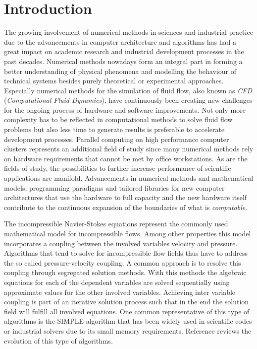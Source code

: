 \section{Introduction}

The growing involvement of numerical methods in sciences and industrial practice due to the advancements in computer architecture and algorithms has had a great impact on academic research and industrial development processes in the past decades. Numerical methods nowadays form an integral part in forming a better understanding of physical phenomena and modelling the behaviour of technical systems besides purely theoretical or experimental approaches. Especially numerical methods for the simulation of fluid flow, also known as \emph{CFD} (\emph{Computational Fluid Dynamics}), have continuously been creating new challenges for the ongoing process of hardware and software improvements. Not only more complexity has to be reflected in computational methods to solve fluid flow problems but also less time to generate results is preferable to accelerate development processes. Parallel computing on high performance computer clusters represents an additional field of study since many numerical methods rely on hardware requirements that cannot be met by office workstations. As are the fields of study, the possibilities to further increase performance of scientific applications are manifold. Advancements in numerical methods and mathematical models, programming paradigms and tailored libraries for new computer architectures that use the hardware to full capacity and the new hardware itself contribute to the continuous expansion of the boundaries of what is \emph{computable}.

The incompressible Navier-Stokes equations represent the commonly used mathematical model for incompressible flows. Among other properties this model incorporates a coupling between the involved variables velocity and pressure. Algorithms that tend to solve for incompressible flow fields thus have to address the so called pressure-velocity coupling. A common approach is to resolve this coupling through segregated solution methods. With this methods the algebraic equations for each of the dependent variables are solved sequentially using approximate values for the other involved variables. Achieving inter variable coupling is part of an iterative solution process such that in the end the solution field will fulfill all involved equations. One common representative of this type of algorithms is the SIMPLE algorithm that has been widely used in scientific codes or industrial solvers due to its small memory requirements. Reference \cite{acharya07} reviews the evolution of this type of algorithms.

